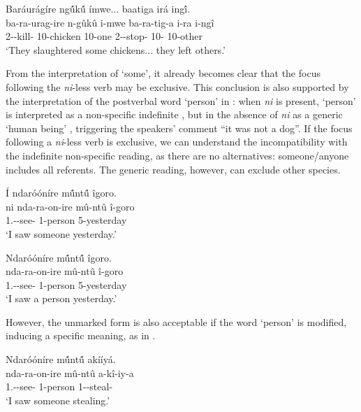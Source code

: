 \documentclass[output=paper]{langscibook}
\begin{document}
\ex
\label{bkm:Ref125199899:b}
Baráurágíre ng\'{û}k\'{û} ímwe... baatiga irá ing\'{î}.\\
\gll
ba-ra-urag-ire  n-gûkû  i-mwe  ba-ra-tig-a i-ra  i-ngî\\
2\SM-\YPST{}-kill-\PFV{} 10-chicken   10-one 2\SM-\YPST{}-stop-\FV{} 10-\RM{} 10-other\\
\glt
‘They slaughtered some chickens... they left others.’

\z
\z

From the interpretation of ‘some’, it already becomes clear that the focus following the \textit{ni}-less verb may be exclusive. This conclusion is also supported by the interpretation of the postverbal word ‘person’ in : when \textit{ni} is present, ‘person’ is interpreted as a non-specific indefinite , but in the absence of \textit{ni} as a generic ‘human being’ , triggering the speakers’ comment “it was not a dog”. If the focus following a \textit{ni}-less verb is exclusive, we can understand the incompatibility with the indefinite non-specific reading, as there are no alternatives: someone/anyone includes all referents. The generic reading, however, can exclude other species.

\ea
\label{bkm:Ref125200200}
\ea
\label{bkm:Ref125200200:a}
Í ndaróóníre m\'{û}nt\'{û} îgoro.\\
\gll
ni  nda-ra-on-ire  mû-ntû  î-goro\\
\FOC{}  1\SG.\SM-\YPST{}-see-\PFV{} 1-person  5-yesterday\\
\glt
‘I saw someone yesterday.’

\ex
\label{bkm:Ref125200200:b}
Ndaróóníre m\'{û}nt\'{û} îgoro.\\
\gll
nda-ra-on-ire  mû-ntû  î-goro\\
1\SG.\SM-\YPST{}-see-\PFV{} 1-person  5-yesterday\\
\glt
‘I saw a person yesterday.’

\z
\z

However, the unmarked form is also acceptable if the word ‘person’ is modified, inducing a specific meaning, as in .

\ea
\label{bkm:Ref119741819}
Ndaróóníre m\'{û}nt\'{û} akííyá.\\
\gll
nda-ra-on-ire   mû-ntû   a-kî-iy-a\\
1\SG.\SM-\YPST{}-see-\PFV{}   1-person   1\SM-\DEP{}-steal-\FV{}\\
\glt
‘I saw someone stealing.’
\end{document}
